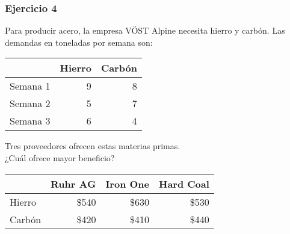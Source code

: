\documentclass[12pt]{beamer}
\begin{document}
  \begin{frame}
    \label{ejercicio-acero}
    \frametitle{Ejercicio 4}
    Para producir acero,
    la empresa VÖST Alpine necesita
    hierro y carbón. Las demandas en toneladas por semana son:

    \begin{center}
      {\footnotesize
      \begin{tabular}{lrr}
        & Hierro & Carbón \\ \hline
        Semana 1 &  9 &   8 \\\hline
        Semana 2 &  5 &   7 \\\hline
        Semana 3 &  6 &   4 \\\hline
      \end{tabular}}
      \vfill
    \end{center}

    Tres proveedores ofrecen estas materias primas. \\
    ¿Cuál ofrece mayor beneficio?
    \vfill

    \begin{center}
      {\footnotesize
      \begin{tabular}{lrrr}
        & Ruhr AG & Iron One & Hard Coal \\\hline
        Hierro & \$540 & \$630 & \$530 \\\hline
        Carbón & \$420 & \$410 & \$440 \\\hline
      \end{tabular}}
      \vspace{2ex}
    \end{center}
  \end{frame}
\end{document}
